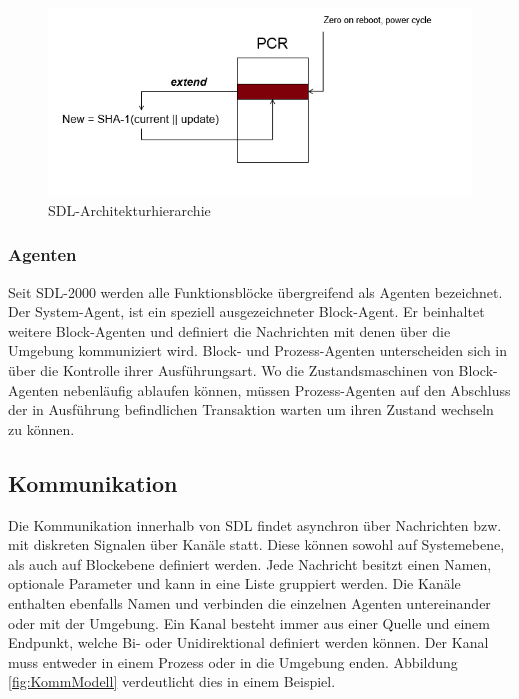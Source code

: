 \begin{figure}[ht]
	\centering
	\includegraphics[width=1\textwidth]{test.png}
	\caption{SDL-Architekturhierarchie}
	\label{fig:ArchModell}
\end{figure}

\subsubsection{Agenten}
Seit \ac{SDL}-2000 werden alle Funktionsblöcke übergreifend als Agenten bezeichnet. Der System-Agent, ist ein speziell ausgezeichneter Block-Agent. Er beinhaltet weitere Block-Agenten und definiert die Nachrichten mit denen über die Umgebung kommuniziert wird. Block- und Prozess-Agenten unterscheiden sich in über die Kontrolle ihrer Ausführungsart. Wo die Zustandsmaschinen von Block-Agenten nebenläufig ablaufen können, müssen Prozess-Agenten auf den Abschluss der in Ausführung befindlichen Transaktion warten um ihren Zustand wechseln zu können.


\subsection{Kommunikation}
\label{ssc:Kommunikation}
Die Kommunikation innerhalb von \ac{SDL} findet asynchron über Nachrichten bzw. mit diskreten Signalen über Kanäle statt. 
Diese können sowohl auf Systemebene, als auch auf Blockebene definiert werden.
Jede Nachricht besitzt einen Namen, optionale Parameter und kann in eine Liste gruppiert werden. 
Die Kanäle enthalten ebenfalls Namen und verbinden die einzelnen Agenten untereinander oder mit der Umgebung.
Ein Kanal besteht immer aus einer Quelle und einem Endpunkt, welche Bi- oder Unidirektional definiert werden können. Der Kanal muss entweder in einem Prozess oder in die Umgebung enden.
Abbildung \ref{fig:KommModell} verdeutlicht dies in einem Beispiel.
 
